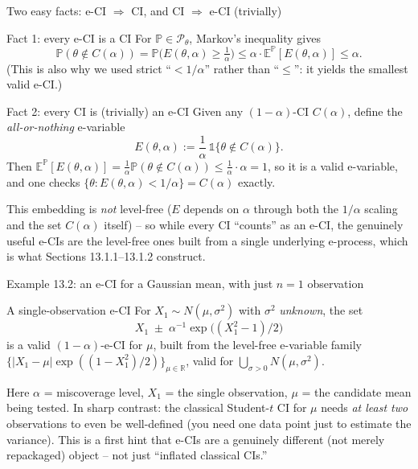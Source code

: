 \documentclass[aspectratio=169,10pt]{beamer}
\newcommand{\R}{\mathbb{R}}
\newcommand{\E}{\mathbb{E}}
\newcommand{\Pb}{\mathbb{P}}
\newcommand{\calP}{\mathcal{P}}
\begin{document}
\begin{frame}{Two easy facts: e-CI $\Rightarrow$ CI, and CI $\Rightarrow$ e-CI (trivially)}
  \begin{block}{Fact 1: every e-CI is a CI}
    For $\Pb \in \calP_\theta$, Markov's inequality gives
    \[
      \Pb(\theta \notin C(\alpha)) = \Pb\big(E(\theta,\alpha) \geq \tfrac1\alpha\big) \leq \alpha \cdot \E^{\Pb}[E(\theta,\alpha)] \leq \alpha.
    \]
    (This is also why we used strict ``$<1/\alpha$'' rather than ``$\leq$'': it yields the smallest valid e-CI.)
  \end{block}

  \begin{block}{Fact 2: every CI is (trivially) an e-CI}
    Given any $(1-\alpha)$-CI $C(\alpha)$, define the \emph{all-or-nothing} e-variable
    \[
      E(\theta,\alpha) := \frac{1}{\alpha}\, \mathbb{1}\{\theta \notin C(\alpha)\}.
    \]
    Then $\E^{\Pb}[E(\theta,\alpha)] = \tfrac1\alpha \Pb(\theta\notin C(\alpha)) \leq \tfrac1\alpha \cdot \alpha = 1$, so it is a valid e-variable, and one checks $\{\theta : E(\theta,\alpha)<1/\alpha\} = C(\alpha)$ exactly.
  \end{block}
  This embedding is \emph{not} level-free ($E$ depends on $\alpha$ through both the $1/\alpha$ scaling and the set $C(\alpha)$ itself) -- so while every CI ``counts'' as an e-CI, the genuinely useful e-CIs are the level-free ones built from a single underlying e-process, which is what Sections 13.1.1--13.1.2 construct.
\end{frame}

\begin{frame}{Example 13.2: an e-CI for a Gaussian mean, with just $n=1$ observation}
  \begin{block}{A single-observation e-CI}
    For $X_1 \sim N(\mu,\sigma^2)$ with $\sigma^2$ \emph{unknown}, the set
    \[
      X_1 \;\pm\; \alpha^{-1}\exp\!\big((X_1^2-1)/2\big)
    \]
    is a valid $(1-\alpha)$-e-CI for $\mu$, built from the level-free e-variable family $\{|X_1-\mu|\exp((1-X_1^2)/2)\}_{\mu\in\R}$, valid for $\bigcup_{\sigma>0} N(\mu,\sigma^2)$.
  \end{block}
  Here $\alpha$ = miscoverage level, $X_1$ = the single observation, $\mu$ = the candidate mean being tested. In sharp contrast: the classical Student-$t$ CI for $\mu$ needs \emph{at least two} observations to even be well-defined (you need one data point just to estimate the variance). This is a first hint that e-CIs are a genuinely different (not merely repackaged) object -- not just ``inflated classical CIs.''
\end{frame}
\end{document}
